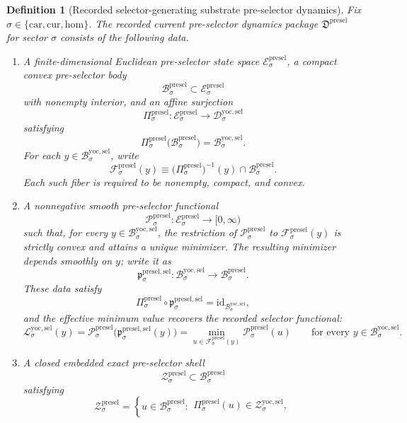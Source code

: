 \documentclass[11pt]{article}
\newcommand{\Car}{\mathrm{car}}
\newcommand{\Cur}{\mathrm{cur}}
\newcommand{\Hom}{\mathrm{hom}}
\newcommand{\YoctoSelectorSpace}[1]{\mathcal D_{#1}^{\mathrm{yoc,sel}}}
\newcommand{\YoctoSelectorBody}[1]{\mathcal B_{#1}^{\mathrm{yoc,sel}}}
\newcommand{\YoctoSelectorFunctional}[1]{\mathscr L_{#1}^{\mathrm{yoc,sel}}}
\newcommand{\YoctoSelectorShell}[1]{\mathcal Z_{#1}^{\mathrm{yoc,sel}}}
\newcommand{\PreSelectorPackage}{\mathfrak D^{\mathrm{presel}}}
\newcommand{\PreSelectorSpace}[1]{\mathcal E_{#1}^{\mathrm{presel}}}
\newcommand{\PreSelectorBody}[1]{\mathcal B_{#1}^{\mathrm{presel}}}
\newcommand{\PreSelectorProj}[1]{\Pi_{#1}^{\mathrm{presel}}}
\newcommand{\PreSelectorFiber}[2]{\mathcal F_{#1}^{\mathrm{presel}}(#2)}
\newcommand{\PreSelectorFunctional}[1]{\mathscr P_{#1}^{\mathrm{presel}}}
\newcommand{\PreSelectorSelectorMin}[1]{\mathfrak p_{#1}^{\mathrm{presel,sel}}}
\newcommand{\PreSelectorShell}[1]{\mathcal Z_{#1}^{\mathrm{presel}}}
\newtheorem{definition}{Definition}
\begin{document}
\begin{definition}[Recorded selector-generating substrate pre-selector dynamics]
\label{def:presel}
Fix \(\sigma\in\{\Car,\Cur,\Hom\}\). The recorded current pre-selector dynamics package \(\PreSelectorPackage\) for sector \(\sigma\) consists of the following data.
\begin{enumerate}
    \item A finite-dimensional Euclidean pre-selector state space \(\PreSelectorSpace{\sigma}\), a compact convex pre-selector body
    \[
    \PreSelectorBody{\sigma}\subset\PreSelectorSpace{\sigma}
    \]
    with nonempty interior, and an affine surjection
    \[
    \PreSelectorProj{\sigma}:\PreSelectorSpace{\sigma}\to\YoctoSelectorSpace{\sigma}
    \]
    satisfying
    \[
    \PreSelectorProj{\sigma}\bigl(\PreSelectorBody{\sigma}\bigr)=\YoctoSelectorBody{\sigma}.
    \]
    For each \(y\in\YoctoSelectorBody{\sigma}\), write
    \[
    \PreSelectorFiber{\sigma}{y}
    \equiv
    \bigl(\PreSelectorProj{\sigma}\bigr)^{-1}(y)\cap\PreSelectorBody{\sigma}.
    \]
    Each such fiber is required to be nonempty, compact, and convex.
    \item A nonnegative smooth pre-selector functional
    \[
    \PreSelectorFunctional{\sigma}:\PreSelectorSpace{\sigma}\to[0,\infty)
    \]
    such that, for every \(y\in\YoctoSelectorBody{\sigma}\), the restriction of \(\PreSelectorFunctional{\sigma}\) to \(\PreSelectorFiber{\sigma}{y}\) is strictly convex and attains a unique minimizer. The resulting minimizer depends smoothly on \(y\); write it as
    \[
    \PreSelectorSelectorMin{\sigma}:\YoctoSelectorBody{\sigma}\to\PreSelectorBody{\sigma}.
    \]
    These data satisfy
    \[
    \PreSelectorProj{\sigma}\circ\PreSelectorSelectorMin{\sigma}
    =
    \mathrm{id}_{\YoctoSelectorBody{\sigma}},
    \]
    and the effective minimum value recovers the recorded selector functional:
    \[
    \YoctoSelectorFunctional{\sigma}(y)
    =
    \PreSelectorFunctional{\sigma}\bigl(\PreSelectorSelectorMin{\sigma}(y)\bigr)
    =
    \min_{u\in\PreSelectorFiber{\sigma}{y}}
    \PreSelectorFunctional{\sigma}(u)
    \qquad
    \text{for every }
    y\in\YoctoSelectorBody{\sigma}.
    \]
    \item A closed embedded exact pre-selector shell
    \[
    \PreSelectorShell{\sigma}\subset\PreSelectorBody{\sigma}
    \]
    satisfying
    \[
    \PreSelectorShell{\sigma}
    =
    \left\{
    u\in\PreSelectorBody{\sigma}:
    \begin{array}{l}
    \PreSelectorProj{\sigma}(u)\in\YoctoSelectorShell{\sigma},\\[0.2em]

\end{array}\]
\end{enumerate}
\end{definition}
\end{document}
